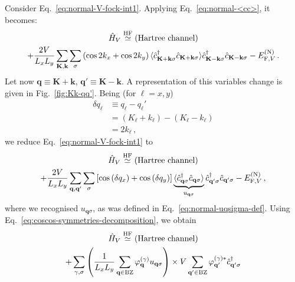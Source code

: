 \begin{tabproof}
	
	Consider Eq.~\eqref{eq:normal-V-fock-int1}. Applying Eq.~\eqref{eq:normal-<cc>}, it becomes:
	\begin{multline}
		\hat H_V \stackrel{\mathrm{HF}}{\simeq} (\text{Hartree channel})\\ + 
		\frac{2V}{L_x L_y} \sum_{\mathbf{K}, \mathbf{k}} \sum_\sigma \left( \cos 2 k_x + \cos 2 k_y	
		\right)
		\langle
		\hat c_{\mathbf{K}+\mathbf{k} \sigma}^\dagger 
		\hat c_{\mathbf{K}+\mathbf{k} \sigma}
		\rangle
		\hat c_{\mathbf{K}-\mathbf{k} \sigma}^\dagger  \hat c_{\mathbf{K}-\mathbf{k}\sigma} - E_{\mathrm{F},V}^{(\mathrm{N})} \, . \label{eq:normal-V-fock-int2}
	\end{multline}
	Let now $\mathbf{q}\equiv\mathbf{K}+\mathbf{k}$, $\mathbf{q}'\equiv\mathbf{K}-\mathbf{k}$. A representation of this variables change is given in Fig.~\ref{fig:Kk-qq'}. Being (for $\ell=x,y$)
	\[
	\begin{aligned}
		\delta q_\ell &\equiv q_\ell - q_\ell' \\
		&= (K_\ell+k_\ell) - (K_\ell-k_\ell) \\
		&= 2k_\ell \, ,
	\end{aligned}
	\]
	we reduce Eq.~\eqref{eq:normal-V-fock-int1} to
	\begin{multline}
		\hat H_V \stackrel{\mathrm{HF}}{\simeq} (\text{Hartree channel}) \\
		+ \frac{2V}{L_x L_y} \sum_{\mathbf{q}, \mathbf{q}'} \sum_\sigma \left[
			\cos \left(
				\delta q_x
			\right)	+ \cos \left(
				\delta q_y
			\right)	
		\right]	
		\underbrace{\langle
			\hat c_{\mathbf{q}\sigma}^\dagger 
			\hat c_{\mathbf{q}\sigma}
		\rangle}_{u_{\mathbf{q}\sigma}}
		\hat c_{\mathbf{q}'\sigma}^\dagger  \hat c_{\mathbf{q}'\sigma} - E_{\mathrm{F},V}^{(\mathrm{N})} \, , \label{eq:normal-V-fock-int3}
	\end{multline}
	where we recognised $u_{\mathbf{q}\sigma}$, as was defined in Eq.~\eqref{eq:normal-uqsigma-def}. Using Eq.~\eqref{eq:coscos-symmetries-decomposition}, we obtain
	\begin{multline}
		\hat H_V \HFsimeq (\text{Hartree channel}) \\
		+ \sum_{\gamma,\sigma} \left(
			\frac{1}{L_x L_y} \sum_\mathbf{q\in\mathrm{BZ}} \varphi_\mathbf{q}^{(\gamma)}
			u_{\mathbf{q}\sigma}
		\right) \times V
		\sum_{\mathbf{q}'\in\mathrm{BZ}}
		\varphi_{\mathbf{q}'}^{(\gamma)*}
		\hat c_{\mathbf{q}'\sigma}^\dagger

\end{multline}
\end{tabproof}
